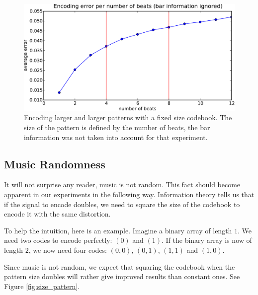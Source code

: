 \documentclass{article}
\begin{document}
\begin{figure}[htb]
\begin{center}
\includegraphics[width=.9\columnwidth]{encoding_per_beat}
\end{center}
\caption{\small{Encoding larger and larger patterns with a fixed size
codebook. The size of the pattern is defined by the number of beats,
the bar information was not taken into account for that experiment.
}}
\label{fig:perbeat}
\end{figure}

\subsection{Music Randomness}\label{ssec:random}
It will not surprise any reader, music is not random. This fact should
become apparent in our experiments in the following way. Information
theory tells us that if the signal to encode doubles, we need to square
the size of the codebook to encode it with the same distortion.

To help the intuition, here is an example. Imagine a binary array of 
length $1$. We need two
codes to encode perfectly: $(0)$ and $(1)$. If the binary array is now of
length $2$, we now need four codes: $(0,0)$, $(0,1)$, $(1,1)$ and $(1,0)$.

Since music is not random, we expect that squaring the codebook when the
pattern size doubles will rather give improved results than constant ones.
See Figure \ref{fig:size_pattern}.
\end{document}
